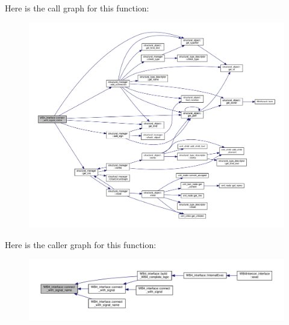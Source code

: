 Here is the call graph for this function\+:
\nopagebreak
\begin{figure}[H]
\begin{center}
\leavevmode
\includegraphics[width=350pt]{d5/d7a/classWB4__interface_ae026b1e7a0037505afcc162c99dbc4ac_cgraph}
\end{center}
\end{figure}
Here is the caller graph for this function\+:
\nopagebreak
\begin{figure}[H]
\begin{center}
\leavevmode
\includegraphics[width=350pt]{d5/d7a/classWB4__interface_ae026b1e7a0037505afcc162c99dbc4ac_icgraph}
\end{center}
\end{figure}
\mbox{\label{classWB4__interface_ac11ca29f65cd4637605343b6e7eb4126}} 
